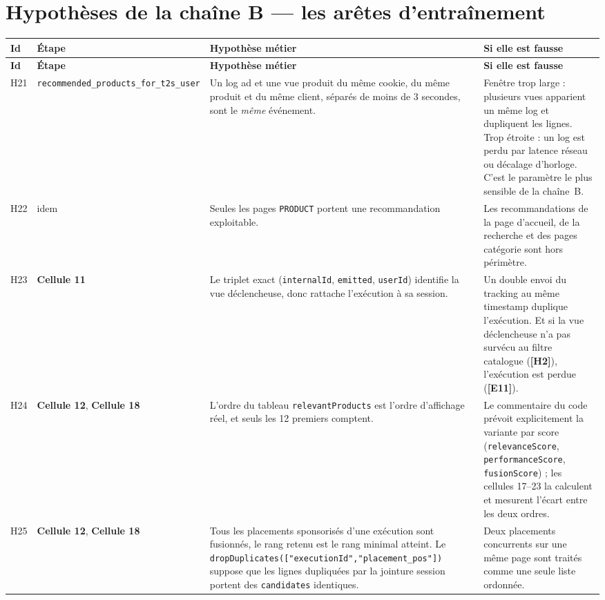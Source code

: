 \documentclass[11pt,a4paper]{article}
\newcommand{\code}[1]{\texttt{\small #1}}
\newcommand{\hyp}[1]{\textcolor{hypcol}{\textbf{\small [#1]}}}
\newcommand{\cell}[1]{\textbf{Cellule #1}}
\begin{document}
\section{Hypothèses de la chaîne B --- les arêtes d'entraînement}
\label{sec:hyp-b}

{\small
\begin{longtable}{@{}l p{2.45cm} p{5.9cm} p{4.5cm}@{}}
\toprule
\textbf{Id} & \textbf{Étape} & \textbf{Hypothèse métier} & \textbf{Si elle est fausse} \\
\midrule
\endfirsthead
\toprule
\textbf{Id} & \textbf{Étape} & \textbf{Hypothèse métier} & \textbf{Si elle est fausse} \\
\midrule
\endhead
\bottomrule
\endfoot

H21 & \code{recommended\_products\_for\_t2s\_user} & Un log ad et une vue produit du même cookie, du même produit et du même client, séparés de moins de 3 secondes, sont le \emph{même} événement. & Fenêtre trop large : plusieurs vues apparient un même log et dupliquent les lignes. Trop étroite : un log est perdu par latence réseau ou décalage d'horloge. C'est le paramètre le plus sensible de la chaîne~B. \\
\addlinespace
H22 & idem & Seules les pages \code{PRODUCT} portent une recommandation exploitable. & Les recommandations de la page d'accueil, de la recherche et des pages catégorie sont hors périmètre. \\
\addlinespace
H23 & \cell{11} & Le triplet exact (\code{internalId}, \code{emitted}, \code{userId}) identifie la vue déclencheuse, donc rattache l'exécution à sa session. & Un double envoi du tracking au même timestamp duplique l'exécution. Et si la vue déclencheuse n'a pas survécu au filtre catalogue (\hyp{H2}), l'exécution est perdue (\hyp{E11}). \\
\addlinespace
H24 & \cell{12}, \cell{18} & L'ordre du tableau \code{relevantProducts} est l'ordre d'affichage réel, et seuls les 12 premiers comptent. & Le commentaire du code prévoit explicitement la variante par score (\code{relevanceScore}, \code{performanceScore}, \code{fusionScore}) ; les cellules 17--23 la calculent et mesurent l'écart entre les deux ordres. \\
\addlinespace
H25 & \cell{12}, \cell{18} & Tous les placements sponsorisés d'une exécution sont fusionnés, le rang retenu est le rang minimal atteint. Le \code{dropDuplicates(["executionId","placement\_pos"])} suppose que les lignes dupliquées par la jointure session portent des \code{candidates} identiques. & Deux placements concurrents sur une même page sont traités comme une seule liste ordonnée. \\

\end{longtable}}
\end{document}

